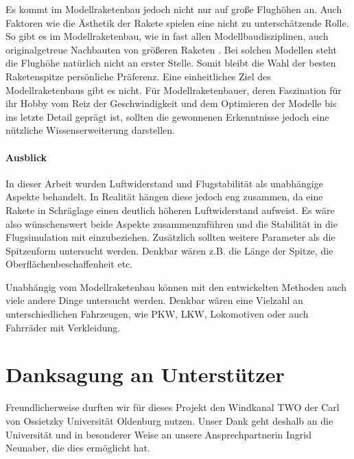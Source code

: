 \documentclass[10pt,a4paper]{article}
\begin{document}
Es kommt im Modellraketenbau jedoch nicht nur auf große Flughöhen an. Auch Faktoren wie die Ästhetik der Rakete spielen eine nicht zu unterschätzende Rolle. So gibt es im Modellraketenbau, wie in fast allen Modellbaudisziplinen, auch originalgetreue Nachbauten von größeren Raketen \cite{om}. Bei solchen Modellen steht die Flughöhe natürlich nicht an erster Stelle.
Somit bleibt die Wahl der besten Raketenspitze persönliche Präferenz. Eine einheitliches Ziel des Modellraketenbaus gibt es nicht. Für Modellraketenbauer, deren Faszination für ihr Hobby vom Reiz der Geschwindigkeit und dem Optimieren der Modelle bis ins letzte Detail geprägt ist, sollten die gewonnenen Erkenntnisse jedoch eine nützliche Wissenserweiterung darstellen.

\paragraph{Ausblick}
In dieser Arbeit wurden Luftwiderstand und Flugstabilität als unabhängige Aspekte behandelt. In Realität hängen diese jedoch eng zusammen, da eine Rakete in Schräglage einen deutlich höheren Luftwiderstand aufweist. Es wäre also wünschenswert beide Aspekte zusammenzuführen und die Stabilität in die Flugsimulation mit einzubeziehen. 
Zusätzlich sollten weitere Parameter als die Spitzenform untersucht werden. Denkbar wären z.B. die Länge der Spitze, die Oberflächenbeschaffenheit etc. 

Unabhängig vom Modellraketenbau können mit den entwickelten Methoden auch viele andere Dinge untersucht werden. Denkbar wären eine Vielzahl an unterschiedlichen Fahrzeugen, wie PKW, LKW, Lokomotiven oder auch Fahrräder mit Verkleidung.



\appendix
\section{Danksagung an Unterstützer}

Freundlicherweise durften wir für dieses Projekt den Windkanal TWO der Carl von Ossietzky Universität Oldenburg nutzen. Unser Dank geht deshalb an die Universität und in besonderer Weise an unsere Ansprechpartnerin Ingrid Neunaber, die dies ermöglicht hat.

\end{document}
